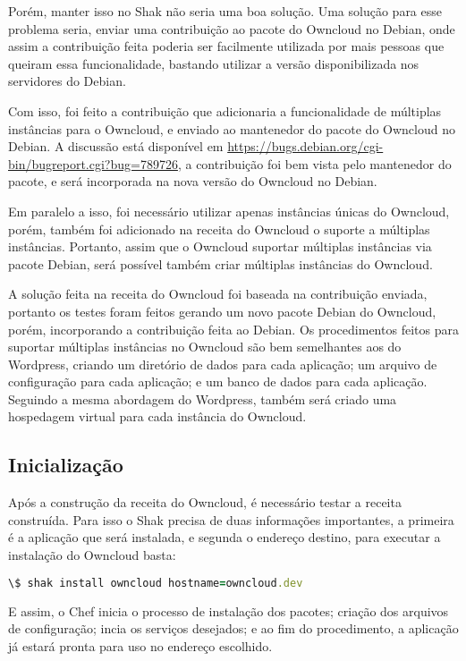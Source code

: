 Porém, manter isso no Shak não seria uma boa solução. Uma solução para esse problema seria, 
enviar uma contribuição ao pacote do Owncloud no Debian, onde assim a contribuição feita
poderia ser facilmente utilizada por mais pessoas que queiram essa funcionalidade,
bastando utilizar a versão disponibilizada nos servidores do Debian. 

Com isso, foi feito a contribuição que adicionaria a funcionalidade de múltiplas 
instâncias para o Owncloud, e enviado ao mantenedor do pacote do Owncloud no Debian. 
A discussão está disponível em \url{https://bugs.debian.org/cgi-bin/bugreport.cgi?bug=789726},
a contribuição foi bem vista pelo mantenedor do pacote, e será incorporada na nova
versão do Owncloud no Debian.

Em paralelo a isso,
foi necessário utilizar apenas instâncias únicas do Owncloud, porém, também foi
adicionado na receita do Owncloud o suporte a múltiplas instâncias. Portanto, 
assim que o Owncloud suportar múltiplas instâncias via pacote Debian, será possível
também criar múltiplas instâncias do Owncloud.

A solução feita na receita do Owncloud foi baseada na contribuição enviada, portanto
os testes foram feitos gerando um novo pacote Debian do Owncloud, porém, incorporando
a contribuição feita ao Debian. Os procedimentos feitos para suportar múltiplas instâncias
no Owncloud são bem semelhantes aos do Wordpress, criando um diretório de dados
para cada aplicação; um arquivo de configuração para cada aplicação; e um banco de
dados para cada aplicação. Seguindo a mesma abordagem do Wordpress, também
será criado uma hospedagem virtual para cada instância do Owncloud.

\subsection{Inicialização}

Após a construção da receita do Owncloud, é necessário testar a receita construída. 
Para isso o Shak precisa de duas informações importantes, a primeira é a aplicação
que será instalada, e segunda o endereço destino, para executar a instalação
do Owncloud basta:

\begin{lstlisting}[language=Ruby,label=dice_index,caption={Exemplo de execução de instalação do Owncloud com shak}]
\$ shak install owncloud hostname=owncloud.dev
\end{lstlisting}

E assim, o Chef inicia o processo de instalação dos pacotes; criação dos arquivos
de configuração; incia os serviços desejados; e ao fim do procedimento, a aplicação
já estará pronta para uso no endereço escolhido.

